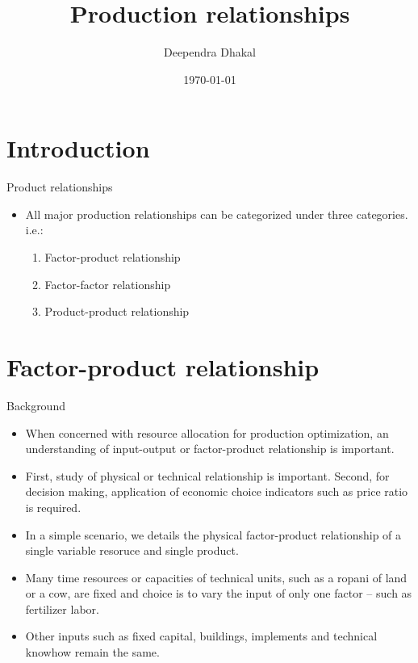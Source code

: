 \documentclass[12pt,ignorenonframetext,aspectratio=169]{beamer}
\title{\insertsectionhead}
  {
    \definecolor{white}{rgb}{0.776,0.357,0.157}
    \definecolor{iqss@orange}{rgb}{1,1,1}
    \ifnum \insertmainframenumber > \insertframenumber
    \frame{
      \frametitle{\iqsssectiontitleheader}
      \tableofcontents[currentsection]
    }
    \else
    \frame{
      \frametitle{Backup Slides}
      \tableofcontents[sectionstyle=shaded/shaded,subsectionstyle=shaded/shaded/shaded]
    }
    \fi
  }
\title[]{Production relationships}
\author[
        Deependra Dhakal
    ]{Deependra Dhakal}
\institute[
    ]{
    GAASC, Baitadi \and Tribhuwan University
    }
\date[
      \today
  ]{
      \today
        }
\providecommand{\tightlist}{%
  \setlength{\itemsep}{0pt}\setlength{\parskip}{0pt}}
\begin{document}
  \begin{frame}[plain]
  \titlepage
  \end{frame}



\hypertarget{introduction}{%
\section{Introduction}\label{introduction}}

\begin{frame}{Product relationships}
\protect\hypertarget{product-relationships}{}
\begin{itemize}
\tightlist
\item
  All major production relationships can be categorized under three
  categories. i.e.:

  \begin{enumerate}
  \tightlist
  \item
    Factor-product relationship
  \item
    Factor-factor relationship
  \item
    Product-product relationship
  \end{enumerate}
\end{itemize}
\end{frame}

\hypertarget{factor-product-relationship}{%
\section{Factor-product
relationship}\label{factor-product-relationship}}

\begin{frame}{Background}
\protect\hypertarget{background}{}
\begin{itemize}
\tightlist
\item
  When concerned with resource allocation for production optimization,
  an understanding of input-output or factor-product relationship is
  important.
\item
  First, study of physical or technical relationship is important.
  Second, for decision making, application of economic choice indicators
  such as price ratio is required.
\item
  In a simple scenario, we details the physical factor-product
  relationship of a single variable resoruce and single product.
\item
  Many time resources or capacities of technical units, such as a ropani
  of land or a cow, are fixed and choice is to vary the input of only
  one factor -- such as fertilizer  labor.
\item
  Other inputs such as fixed capital, buildings, implements and
  technical knowhow remain the same.
\end{itemize}
\end{frame}
\end{document}
